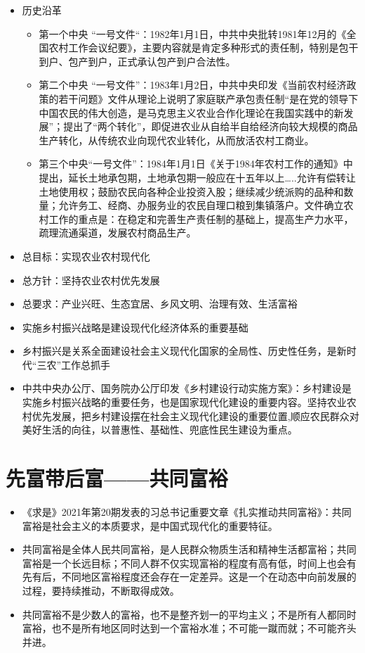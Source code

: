 \documentclass[
]{ctexart}
\providecommand{\tightlist}{%
  \setlength{\itemsep}{0pt}\setlength{\parskip}{0pt}}
\begin{document}
\begin{itemize}
\tightlist
\item
  历史沿革

  \begin{itemize}
  \tightlist
  \item
    第一个中央
    ``一号文件``：1982年1月1日，中共中央批转1981年12月的《全国农村工作会议纪要》，主要内容就是肯定多种形式的责任制，特别是包干到户、包产到户，正式承认包产到户合法性。
  \item
    第二个中央
    ``一号文件''：1983年1月2日，中共中央印发《当前农村经济政策的若干问题》文件从理论上说明了家庭联产承包责任制``是在党的领导下中国农民的伟大创造，是马克思主义农业合作化理论在我国实践中的新发展''；提出了``两个转化''，即促进农业从自给半自给经济向较大规模的商品生产转化，从传统农业向现代农业转化，从而放活农村工商业。
  \item
    第三个中央``一号文件''：1984年1月1日《关于1984年农村工作的通知》中提出，延长土地承包期，土地承包期一般应在十五年以上\ldots..允许有偿转让土地使用权；鼓励农民向各种企业投资入股；继续减少统派购的品种和数量；允许务工、经商、办服务业的农民自理口粮到集镇落户。文件确立农村工作的重点是：在稳定和完善生产责任制的基础上，提高生产力水平，疏理流通渠道，发展农村商品生产。
  \end{itemize}
\item
  总目标：实现农业农村现代化
\item
  总方针：坚持农业农村优先发展
\item
  总要求：产业兴旺、生态宜居、乡风文明、治理有效、生活富裕
\item
  实施乡村振兴战略是建设现代化经济体系的重要基础
\item
  乡村振兴是关系全面建设社会主义现代化国家的全局性、历史性任务，是新时代``三农''工作总抓手
\item
  中共中央办公厅、国务院办公厅印发《乡村建设行动实施方案》：乡村建设是实施乡村振兴战略的重要任务，也是国家现代化建设的重要内容。坚持农业农村优先发展，把乡村建设摆在社会主义现代化建设的重要位置,顺应农民群众对美好生活的向往，以普惠性、基础性、兜底性民生建设为重点。
\end{itemize}

\hypertarget{ux5148ux5bccux5e26ux540eux5bccux5171ux540cux5bccux88d5}{%
\section{先富带后富------共同富裕}\label{ux5148ux5bccux5e26ux540eux5bccux5171ux540cux5bccux88d5}}

\begin{itemize}
\tightlist
\item
  《求是》2021年第20期发表的习总书记重要文章《扎实推动共同富裕》：共同富裕是社会主义的本质要求，是中国式现代化的重要特征。
\item
  共同富裕是全体人民共同富裕，是人民群众物质生活和精神生活都富裕；共同富裕是一个长远目标；不同人群不仅实现富裕的程度有高有低，时间上也会有先有后，不同地区富裕程度还会存在一定差异。这是一个在动态中向前发展的过程，要持续推动，不断取得成效。
\item
  共同富裕不是少数人的富裕，也不是整齐划一的平均主义；不是所有人都同时富裕，也不是所有地区同时达到一个富裕水准；不可能一蹴而就；不可能齐头并进。
\end{itemize}
\end{document}
